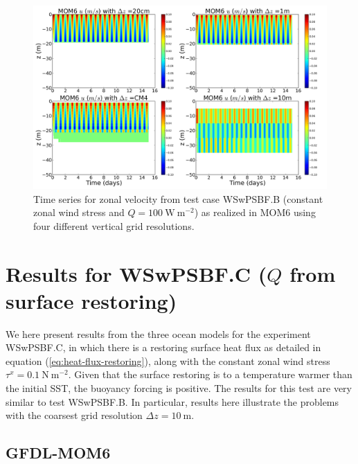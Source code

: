 \begin{figure}[h!t]
\begin{center}
\includegraphics[angle=0,width=14cm]{./figs/MOM6/WSwPSBF_B_MOM6_zonal_velocity.png}
\caption[Zonal velocity from MOM6 for WSwPSBF.B ]{\sf Time series for
  zonal velocity from test case WSwPSBF.B (constant zonal wind stress
  and $Q=100~\mbox{W}~\mbox{m}^{-2}$) as realized in MOM6 using four
  different vertical grid resolutions.}
\label{fig:WSwPSBF_B_MOM6_zonal}
\end{center}
\end{figure}

\clearpage 




\section{Results for WSwPSBF.C ($Q$ from surface restoring)}
\label{section:WSwPSBFC}

We here present results from the three ocean models for the experiment
WSwPSBF.C, in which there is a restoring surface heat flux as detailed
in equation (\ref{eq:heat-flux-restoring}), along with the constant
zonal wind stress $\tau^{x} = 0.1~\mbox{N}~\mbox{m}^{-2}$.  Given that
the surface restoring is to a temperature warmer than the initial SST,
the buoyancy forcing is positive.  The results for this test are very
similar to test WSwPSBF.B.  In particular, results here illustrate the
problems with the coarsest grid resolution $\Delta z = 10~\mbox{m}$.

\subsection{GFDL-MOM6} 

